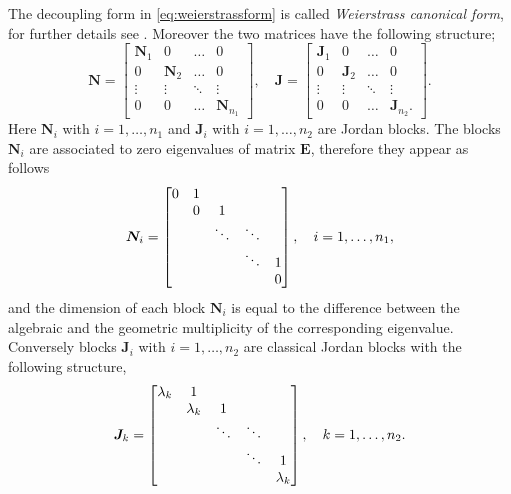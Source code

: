 		The decoupling form in \cref{eq:weierstrassform} is called 
		\emph{Weierstrass canonical form}, for further details see
		\cite{gantmacher1964theory}.
		Moreover the two matrices have the following structure;
		\begin{equation}
			\bm{N} = 
			\begin{bmatrix}
				\bm{N}_{1} & 0 & \dots & 0 \\
				0 & \bm{N}_{2} & \dots & 0 \\
				\vdots & \vdots & \ddots & \vdots\\
				0 & 0 & \dots & \bm{N}_{n_{1}}	
			\end{bmatrix},\quad
			\bm{J} =
			\begin{bmatrix}
				\bm{J}_{1} & 0 & \dots & 0 \\
				0 & \bm{J}_{2} & \dots & 0 \\
				\vdots & \vdots & \ddots & \vdots\\
				0 & 0 & \dots & \bm{J}_{n_{2}}.
			\end{bmatrix}.
		\end{equation}
		Here $\bm{N}_{i}$ with $i=1,\dots,n_{1}$ and $\bm{J}_{i}$ with $i=1,\dots,n_{2}$ 
		are Jordan blocks. The blocks $\bm{N}_{i}$ are associated to zero
		eigenvalues of matrix $\bm{E}$, therefore they appear as follows
		\begin{equation}
			\bm{N}_{i} = 
			\begin{bmatrix}
				0 	& 1 	& 			&			&  	\\
				  	& 0 	& 1 		&			& 	\\
					&   	& \ddots 	&	\ddots	&  \\
					&   	& 			& 	\ddots	& 1 \\
					&		&			&			& 0
			\end{bmatrix}, \quad i =1,\dots,n_{1}	\\,
		\end{equation}
		and the dimension of each block $\bm{N}_{i}$ is equal to the
		difference between the algebraic and the geometric multiplicity
		of the corresponding eigenvalue. Conversely blocks $\bm{J}_{i}$
		with $i=1,\dots,n_{2}$ are classical Jordan blocks with the following structure,
		\begin{equation}	
			\bm{J}_{k} = 
				\begin{bmatrix}
					\lambda_{k} 	& 1 	& 			&			&  	\\
						& \lambda_{k} 	& 1 		&			& 	\\
						&   	& \ddots 	&	\ddots	&  \\
						&   	& 			& 	\ddots	& 1 \\
						&		&			&			& \lambda_{k}
				\end{bmatrix}, \quad k =1,\dots,n_{2}	\\.
		\end{equation}
